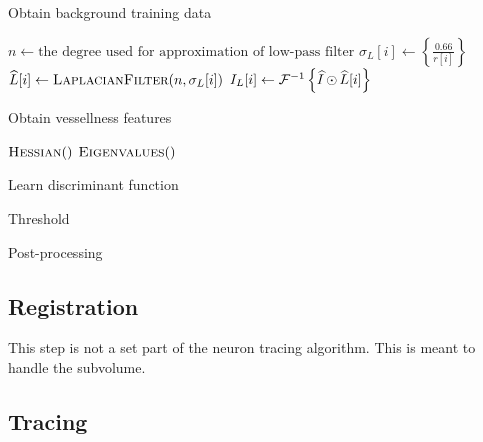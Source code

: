 \begin{algorithm}
	\caption{Obtain background training data}\label{alg:seg_bg_train}
	\begin{algorithmic}[1]
		\State $n \gets \text{the degree used for approximation of low-pass filter}$
		\State $\sigma_{L}[i] \gets \left\{ \frac{0.66}{r[i]} \right\}$
		\State $\freqdom{L}[i] \gets \Call{LaplacianFilter}{n, \sigma_{L}[i]}$
		\State ${I}_{L}[i] \gets \mathcal{F}^{-1}\left\{ \widehat{I} \mathop{\odot} \widehat{L}[i] \right\}$
		\State
	\end{algorithmic}
\end{algorithm}

\begin{algorithm}
	\caption{Obtain vessellness features}\label{alg:seg_vessellness}
	\begin{algorithmic}[1]
		$\Call{Hessian}$
		$\Call{Eigenvalues}$
	\end{algorithmic}
\end{algorithm}

\begin{algorithm}
	\caption{Learn discriminant function}\label{alg:seg_discrim}
	\begin{algorithmic}[1]
	\end{algorithmic}
\end{algorithm}

\begin{algorithm}
	\caption{Threshold}\label{alg:seg_threshold}
	\begin{algorithmic}[1]
	\end{algorithmic}
\end{algorithm}

\begin{algorithm}
	\caption{Post-processing}\label{alg:seg_post}
	\begin{algorithmic}[1]
	\end{algorithmic}
\end{algorithm}

\subsection{Registration}

This step is not a set part of the neuron tracing algorithm. This
is meant to handle the subvolume.

\subsection{Tracing}

